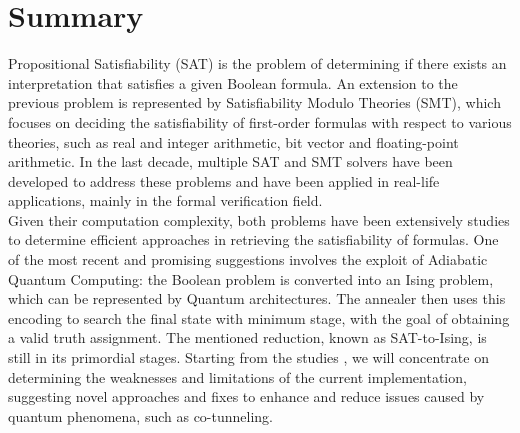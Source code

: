 \chapter*{Summary} %
\label{sommario}

Propositional Satisfiability (SAT) is the problem of determining if there exists an interpretation that satisfies a given Boolean formula. An extension to the previous problem is represented by Satisfiability Modulo Theories (SMT), which focuses on deciding the satisfiability of first-order formulas with respect to various theories, such as real and integer arithmetic, bit vector and floating-point arithmetic. In the last decade, multiple SAT and SMT solvers have been developed to address these problems and have been applied in real-life applications, mainly in the formal verification field. \\
Given their computation complexity, both problems have been extensively studies to determine efficient approaches in retrieving the satisfiability of formulas. One of the most recent and promising suggestions involves the exploit of Adiabatic Quantum Computing: the Boolean problem is converted into an Ising problem, which can be represented by Quantum architectures. The annealer then uses this encoding to search the final state with minimum stage, with the goal of obtaining  a valid truth assignment. The mentioned reduction, known as SAT-to-Ising, is still in its primordial stages. Starting from the studies , we will concentrate on determining the weaknesses and limitations of the current implementation, suggesting novel approaches and fixes to enhance and reduce issues caused by quantum phenomena, such as co-tunneling.

\newpage






